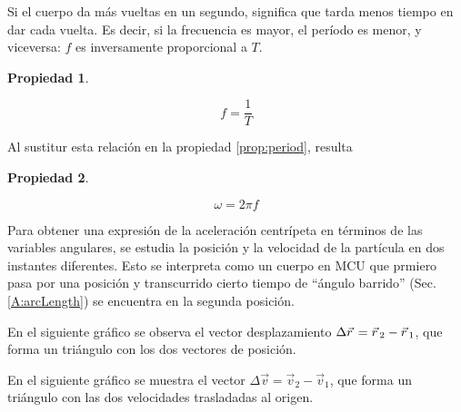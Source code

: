 \documentclass[a5paper,12pt,twoside]{book}
\newtheorem{prop}{{Propiedad}}[chapter]
\begin{document}
Si el cuerpo da más vueltas en un segundo, significa que tarda menos tiempo en dar cada vuelta.
Es decir, si la frecuencia es mayor, el período es menor, y viceversa: $f$ es inversamente proporcional a $T$.

\begin{mdframed}[style=MyFrame1]
    \begin{prop}
    \end{prop}
    \begin{equation*}
        f = \dfrac{1}{T}
    \end{equation*}
\end{mdframed}

Al sustitur esta relación en la propiedad \ref{prop:period}, resulta

\begin{mdframed}[style=MyFrame1]
    \begin{prop}
    \end{prop}
    \begin{equation*}
        \omega = 2 \pi f
    \end{equation*}
\end{mdframed}

Para obtener una expresión de la aceleración centrípeta en términos de las variables angulares, se estudia la posición y la velocidad de la partícula en dos instantes diferentes.
Esto se interpreta como un cuerpo en MCU que prmiero pasa por una posición y transcurrido cierto tiempo de ``ángulo barrido'' (Sec. \ref{A:arcLength}) se encuentra en la segunda posición.

\begin{center}
    \def\svgwidth{0.8\linewidth}
    
\end{center}

En el siguiente gráfico se observa el vector desplazamiento $\Delta \vec{r}\hspace{0.05cm} = \vec{r}\hspace{0.05cm}_2-\vec{r}\hspace{0.05cm}_1$, que forma un triángulo con los dos vectores de posición.

\begin{center}
    \def\svgwidth{0.8\linewidth}
    
\end{center}

En el siguiente gráfico se muestra el vector $\Delta \Vec{v} = \Vec{v}_2-\Vec{v}_1$, que forma un triángulo con las dos velocidades trasladadas al origen.

\begin{center}
    \def\svgwidth{0.8\linewidth}
    
\end{center}
\end{document}
